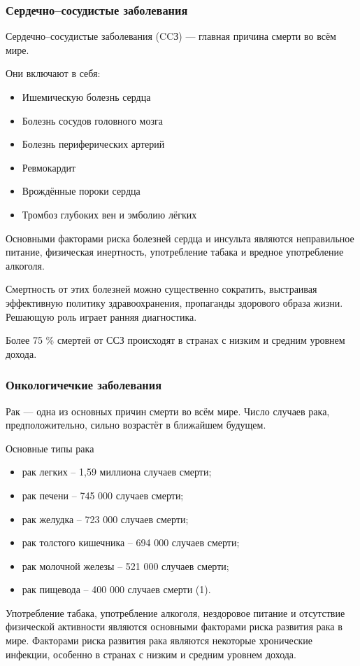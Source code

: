 \documentclass[10pt]{beamer}
\begin{document}
	\begin{frame}
		\frametitle{Сердечно--сосудистые заболевания}
		{
		\small
		Сердечно--сосудистые заболевания (CCЗ) --- главная причина смерти во всём мире.
		\begin{block}{Они включают в себя:}
			\begin{itemize}
				\item Ишемическую болезнь сердца
				\item Болезнь сосудов головного мозга
				\item Болезнь периферических артерий
				\item Ревмокардит
				\item Врождённые пороки сердца
				\item Тромбоз глубоких вен и эмболию лёгких	
			\end{itemize}
		\end{block}
		Основными факторами риска болезней сердца и инсульта являются неправильное питание, физическая инертность, употребление табака и вредное употребление алкоголя.

		Смертность от этих болезней можно существенно сократить, выстраивая эффективную политику здравоохранения, пропаганды здорового образа жизни. Решающую роль играет ранняя диагностика.

		Более 75 \% смертей от ССЗ происходят в странах с низким и средним уровнем дохода.
		}
		
	\end{frame}
		
	\begin{frame}
		\frametitle{Онкологичечкие заболевания}
		{\small
		Рак --- одна из основных причин смерти во всём мире. Число случаев рака, предположительно, сильно возрастёт в ближайшем будущем.
		\begin{block}{Основные типы рака}		
			\begin{itemize}
\item    рак легких – 1,59 миллиона случаев смерти;
\item    рак печени – 745 000 случаев смерти;
\item    рак желудка – 723 000 случаев смерти;
\item    рак толстого кишечника – 694 000 случаев смерти;
\item    рак молочной железы – 521 000 случаев смерти;
\item    рак пищевода – 400 000 случаев смерти (1).
			\end{itemize}
		\end{block}
Употребление табака, употребление алкоголя, нездоровое питание и отсутствие физической активности являются основными факторами риска развития рака в мире. Факторами риска развития рака являются некоторые хронические инфекции, особенно в странах с низким и средним уровнем дохода. 
		}
		
	\end{frame}
\end{document}
